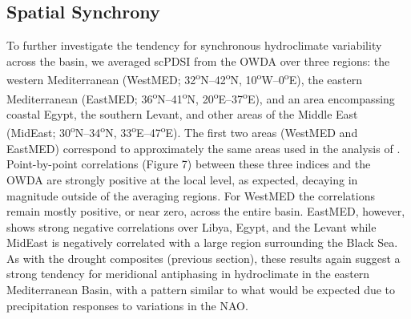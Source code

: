 \documentclass[draft,jgr]{AGUTeX}
\begin{document}
\begin{article}
\subsection{Spatial Synchrony}
\noindent To further investigate the tendency for synchronous hydroclimate variability across the basin, we averaged scPDSI from the OWDA over three regions: the western Mediterranean (WestMED; 32\textsuperscript{o}N--42\textsuperscript{o}N, 10\textsuperscript{o}W--0\textsuperscript{o}E), the eastern Mediterranean (EastMED; 36\textsuperscript{o}N--41\textsuperscript{o}N, 20\textsuperscript{o}E--37\textsuperscript{o}E), and an area encompassing coastal Egypt, the southern Levant, and other areas of the Middle East (MidEast; 30\textsuperscript{o}N--34\textsuperscript{o}N, 33\textsuperscript{o}E--47\textsuperscript{o}E). The first two areas (WestMED and EastMED) correspond to approximately the same areas used in the analysis of \citet{Roberts:etal2012}. Point-by-point correlations (Figure 7) between these three indices and the OWDA are strongly positive at the local level, as expected, decaying in magnitude outside of the averaging regions. For WestMED the correlations remain mostly positive, or near zero, across the entire basin. EastMED, however, shows strong negative correlations over Libya, Egypt, and the Levant while MidEast is negatively correlated with a large region surrounding the Black Sea. As with the drought composites (previous section), these results again suggest a strong tendency for meridional antiphasing in hydroclimate in the eastern Mediterranean Basin, with a pattern similar to what would be expected due to precipitation responses to variations in the NAO.\\

\end{article}
\end{document}
